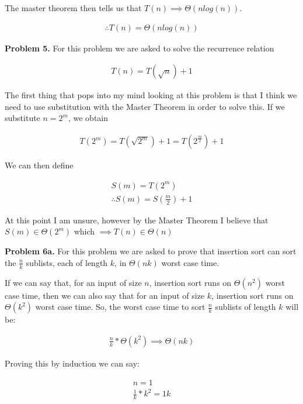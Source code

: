 \documentclass{article}
\begin{document}
The master theorem then tells us that $T(n) \implies \Theta(nlog(n))$.

\begin{gather}
    \therefore T(n) = \Theta(nlog(n))
\end{gather}

\hfill

\textbf{Problem 5.} For this problem we are asked to solve the recurrence relation

\begin{gather}
    T(n) = T(\sqrt{n}) + 1
\end{gather}

The first thing that pops into my mind looking at this problem is that I think we need to use substitution with the Master Theorem in order to solve this. If we substitute $n = 2^m$, we obtain

\begin{gather}
    T(2^m) = T(\sqrt{2^m}) + 1 = T(2^{\frac{m}{2}}) + 1
\end{gather}

We can then define

\begin{gather}
    S(m) = T(2^m) \\
    \therefore S(m) = S(\frac{m}{2}) + 1
\end{gather}

At this point I am unsure, however by the Master Theorem I believe that $S(m) \in \Theta(2^m)$ which $\implies T(n) \in \Theta(n)$

\hfill

\textbf{Problem 6a.} For this problem we are asked to prove that insertion sort can sort the $\frac{n}{k}$ sublists, each of length $k$, in $\Theta(nk)$ worst case time.

If we can say that, for an input of size $n$, insertion sort runs on $\Theta(n^2)$ worst case time, then we can also say that for an input of size $k$, insertion sort runs on $\Theta(k^2)$ worst case time. So, the worst case time to sort $\frac{n}{k}$ sublists of length $k$ will be:

\begin{gather}
    \frac{n}{k} * \Theta(k^2) \implies \Theta(nk)
\end{gather}

Proving this by induction we can say:

\begin{gather}
    n = 1 \\
    \frac{1}{k}*k^2 = 1k
\end{gather}
\end{document}
